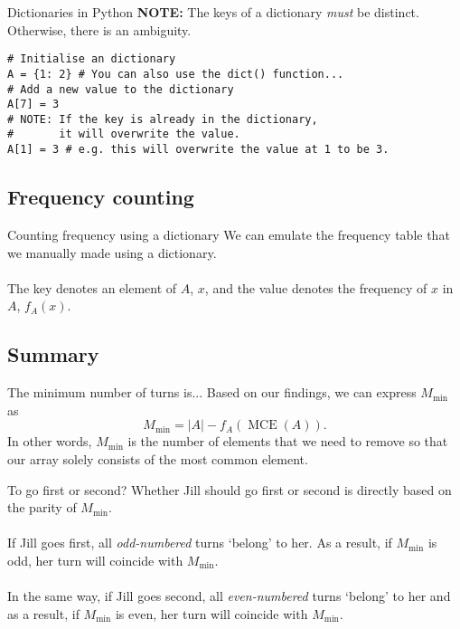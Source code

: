 \documentclass{beamer}
\DeclareMathOperator{\MCE}{MCE}
\begin{document}
\begin{frame}[fragile]{Dictionaries in Python}
    \textbf{NOTE:} The keys of a dictionary \textit{must} be distinct. Otherwise, there is an ambiguity.
    \begin{center}
    \begin{lstlisting}[language=iPython]
# Initialise an dictionary
A = {1: 2} # You can also use the dict() function...
# Add a new value to the dictionary
A[7] = 3 
# NOTE: If the key is already in the dictionary,
#       it will overwrite the value.
A[1] = 3 # e.g. this will overwrite the value at 1 to be 3. 
    \end{lstlisting}
    \end{center}
\end{frame}

\subsection{Frequency counting}
\begin{frame}{Counting frequency using a dictionary}
    We can emulate the frequency table that we manually made using a dictionary.\\~\\
    The key denotes an element of $A$, $x$, and the value denotes the frequency of $x$ in $A$, $f_A(x)$.
\end{frame}

\subsection{Summary}
\begin{frame}{The minimum number of turns is...}
    Based on our findings, we can express $M_{\min}$ as $$M_{\min}=|A|-f_A\left({\MCE}(A)\right).$$
    In other words, $M_{\min}$ is the number of elements that we need to remove so that our array solely consists of the most common element.
\end{frame}

\begin{frame}{To go first or second?}
    Whether Jill should go first or second is directly based on the parity of $M_{\min}$.\\~\\
    If Jill goes first, all \textit{odd-numbered} turns `belong' to her. As a result, if $M_{\min}$ is odd, her turn will coincide with $M_{\min}$.\\~\\
    In the same way, if Jill goes second, all \textit{even-numbered} turns `belong' to her and as a result, if $M_{\min}$ is even, her turn will coincide with $M_{\min}$.
\end{frame}
\end{document}
